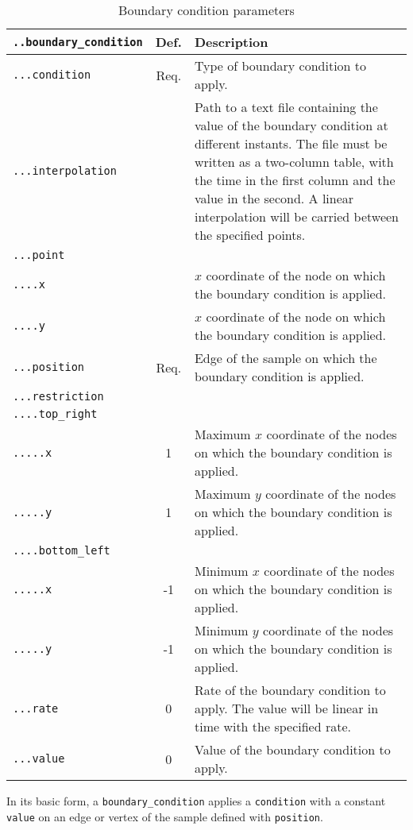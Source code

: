 \documentclass[10pt]{article}
\begin{document}
\begin{table}[h!]
\begin{tabularx}{\textwidth}{lcX}
\verb+..boundary_condition+ & Def. & Description\\
\hline
\verb+...condition+ & Req.  & Type of boundary condition to apply. \\	
\verb+...interpolation+ &  & Path to a text file containing the value of the boundary condition at different instants. The file must be written as a two-column table, with the time in the first column and the value in the second. A linear interpolation will be carried between the specified points. \\	
\verb+...point+ & & \\
\verb+....x+ & & $x$ coordinate of the node on which the boundary condition is applied.\\
\verb+....y+ & & $x$ coordinate of the node on which the boundary condition is applied.\\
\verb+...position+ & Req.  & Edge of the sample on which the boundary condition is applied. \\	
\verb+...restriction+ & & \\
\verb+....top_right+ & & \\
\verb+.....x+ & 1 & Maximum $x$ coordinate of the nodes on which the boundary condition is applied.\\
\verb+.....y+ & 1 & Maximum $y$ coordinate of the nodes on which the boundary condition is applied.\\
\verb+....bottom_left+ & & \\
\verb+.....x+ & -1 & Minimum $x$ coordinate of the nodes on which the boundary condition is applied.\\
\verb+.....y+ & -1 & Minimum $y$ coordinate of the nodes on which the boundary condition is applied.\\
\verb+...rate+ & 0  & Rate of the boundary condition to apply. The value will be linear in time with the specified rate. \\	
\verb+...value+ & 0  & Value of the boundary condition to apply. \\	
\hline
\end{tabularx}
\caption{Boundary condition parameters}
\end{table}

In its basic form, a \verb+boundary_condition+ applies a \verb+condition+ with a constant \verb+value+ on an edge or vertex of the sample defined with \verb+position+.

\eject
\end{document}
